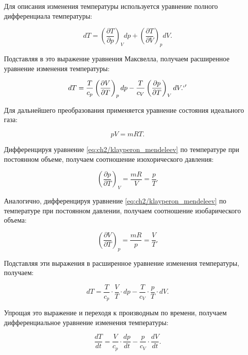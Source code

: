 Для описания изменения температуры используется уравнение полного дифференциала температуры:

\begin{equation*}
    dT = \left(\frac{\partial T}{\partial p}\right)_V dp + \left(\frac{\partial T}{\partial V}\right)_p dV.
\end{equation*}

Подставляя в это выражение уравнения Максвелла, получаем расширенное уравнение изменения температуры:

\begin{equation*}
    dT = \frac{T}{c_p} \left(\frac{\partial V}{\partial T}\right)_p dp - \frac{T}{c_V} \left(\frac{\partial p}{\partial T}\right)_V dV.`'
\end{equation*}

Для дальнейшего преобразования применяется уравнение состояния идеального газа:

\begin{equation}\label{eq:ch2/klayperon_mendeleev}
    pV = mRT.
\end{equation}

Дифференцируя уравнение \eqref{eq:ch2/klayperon_mendeleev} по температуре при постоянном объеме, получаем соотношение изохорического давления:

\begin{equation*}
    \left(\frac{\partial p}{\partial T}\right)_V = \frac{mR}{V} = \frac{p}{T}.
\end{equation*}

Аналогично, дифференцируя уравнение \eqref{eq:ch2/klayperon_mendeleev} по температуре при постоянном давлении,
получаем соотношение изобарического объема:

\begin{equation*}
    \left(\frac{\partial V}{\partial T}\right)_p = \frac{mR}{p} = \frac{V}{T}.
\end{equation*}

Подставляя эти выражения в расширенное уравнение изменения температуры, получаем:

\begin{equation*}
    dT = \frac{T}{c_p} \cdot \frac{V}{T} \cdot dp - \frac{T}{c_V} \cdot \frac{p}{T} \cdot dV.
\end{equation*}

Упрощая это выражение и переходя к производным по времени, получаем дифференциальное уравнение изменения температуры:

\begin{equation*}
    \frac{dT}{dt} = \frac{V}{c_p} \cdot \frac{dp}{dt} - \frac{p}{c_V} \cdot \frac{dV}{dt}.
\end{equation*}


